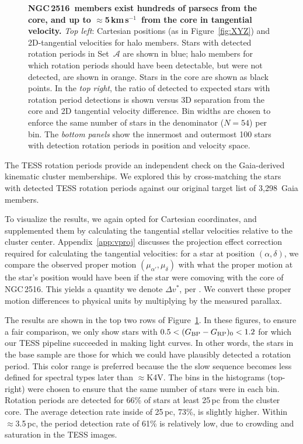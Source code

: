 \documentclass[12pt,twocolumn,tighten]{aastex63}
\newcommand{\cn}{NGC\,2516} %
\newcommand{\nkinematic}{3{,}298} %
\newcommand{\kms}{\,km\,s$^{-1}$}
\newcommand{\bpmrpo}{(G_{\rm BP}-G_{\rm RP})_0}
\begin{document}
\begin{figure}[t]
\begin{center}
	\end{center}
	\vspace{-0.7cm}
  \caption{ 
  {\bf \cn\ members exist hundreds of parsecs from the core, and up
  to $\approx$5\kms\ from the core in tangential velocity.} {\it Top
  left}: Cartesian positions (as in Figure~\ref{fig:XYZ}) and
  2D-tangential velocities for halo members.  Stars with detected
  rotation periods in Set~$\mathcal{A}$ are shown in blue;  halo
  members for which rotation periods should have been detectable, but
  were not detected, are shown in orange.  Stars in the core are shown
  as black points.  In
  the {\it top right}, the 
  ratio of detected to expected stars with rotation period detections is shown
  versus 3D separation from
  the core and 2D tangential velocity difference.  Bin widths are
  chosen to enforce the same number of stars in the denominator
  ($N=54$) per bin.  The {\it bottom panels} show the innermost and
  outermost 100 stars with detection rotation periods in position and
  velocity space.
  \label{fig:physical_x_rotn}
	}
\end{figure}

The TESS rotation periods provide an independent check on the
Gaia-derived kinematic cluster memberships.  We explored this by
cross-matching the stars with detected TESS rotation periods against
our original target list of \nkinematic\ Gaia members.  

To visualize the results, we again opted for Cartesian coordinates,
and supplemented them by calculating the tangential stellar velocities
relative to the cluster center.  Appendix~\ref{app:vproj} discusses
the projection effect correction required for calculating the
tangential velocities: for a star at position $(\alpha, \delta)$, we
compare the observed proper motion $(\mu_{\alpha'}, \mu_\delta)$ with
what the proper motion at the star's position would have been if the
star were comoving with the core of \cn.  This yields a quantity we
denote $\Delta v^{*}$, per .  We convert
these proper motion differences to physical units by multiplying by
the measured parallax.  

The results are shown in the top two rows of
Figure~\ref{fig:physical_x_rotn}.  In these figures, to ensure a fair
comparison, we only show stars with $0.5<\bpmrpo<1.2$ for which our
TESS pipeline succeeded in making light curves.  In other words, the
stars in the base sample are those for which we could have plausibly
detected a rotation period.  This color range is preferred because the
the slow sequence becomes less defined for spectral types later than
$\approx$K4V.  The bins in the histograms (top-right) were chosen to
ensure that the same number of stars were in each bin.  Rotation
periods are detected for 66\% of stars at least 25\,pc from the
cluster core.  The average detection rate inside of 25\,pc, 73\%, is
slightly higher.  Within $\approx$3.5\,pc, the period detection rate of
61\% is relatively low, due to crowding and saturation in the TESS
images.
\end{document}
